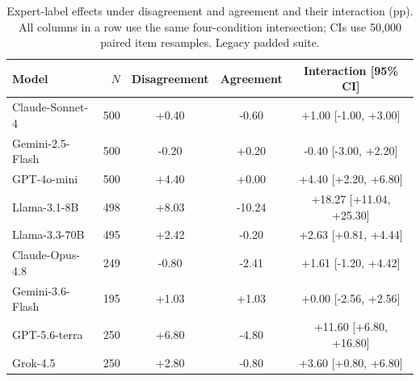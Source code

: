 \begin{table}[htbp]
\caption{Expert-label effects under disagreement and agreement and their interaction (pp). All columns in a row use the same four-condition intersection; CIs use 50,000 paired item resamples. Legacy padded suite.}
\label{tab:agreement_interaction}
\centering
\small
\setlength{\tabcolsep}{3.5pt}
\begin{tabular}{lrccc}
\toprule
Model & $N$ & Disagreement & Agreement & Interaction [95\% CI] \\
\midrule
Claude-Sonnet-4 & 500 & +0.40 & -0.60 & +1.00 [-1.00, +3.00] \\
Gemini-2.5-Flash & 500 & -0.20 & +0.20 & -0.40 [-3.00, +2.20] \\
GPT-4o-mini & 500 & +4.40 & +0.00 & +4.40 [+2.20, +6.80] \\
Llama-3.1-8B & 498 & +8.03 & -10.24 & +18.27 [+11.04, +25.30] \\
Llama-3.3-70B & 495 & +2.42 & -0.20 & +2.63 [+0.81, +4.44] \\
Claude-Opus-4.8 & 249 & -0.80 & -2.41 & +1.61 [-1.20, +4.42] \\
Gemini-3.6-Flash & 195 & +1.03 & +1.03 & +0.00 [-2.56, +2.56] \\
GPT-5.6-terra & 250 & +6.80 & -4.80 & +11.60 [+6.80, +16.80] \\
Grok-4.5 & 250 & +2.80 & -0.80 & +3.60 [+0.80, +6.80] \\
\bottomrule
\end{tabular}
\end{table}
